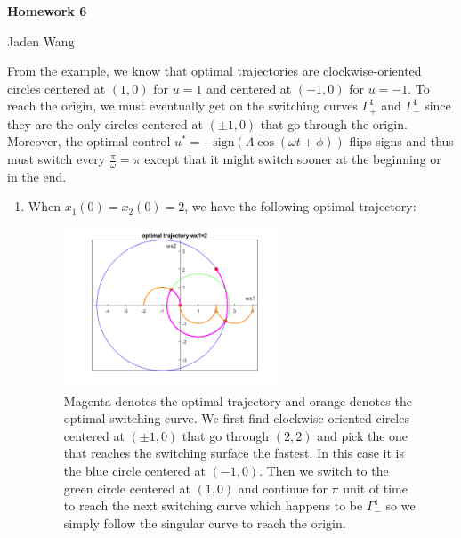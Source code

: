 \documentclass[12pt]{article}
\begin{document}
\centerline {\textsf{\textbf{\LARGE{Homework 6}}}}
\centerline {Jaden Wang}
\vspace{.15in}
\begin{problem}[1]
From the example, we know that optimal trajectories are clockwise-oriented circles centered at $ ( 1,0)$ for $ u=1$  and centered at $ (-1,0)$ for $ u = - 1$. To reach the origin, we must eventually get on the switching curves $ \Gamma_+^{1} $ and $ \Gamma_{-}^{1}$ since they are the only circles centered at $ (\pm1,0)$ that go through the origin. Moreover, the optimal control $ u^*  = - \text{sign}(\Lambda \cos(\omega t + \phi))$ flips signs and thus must switch every  $ \frac{\pi}{ \omega} = \pi$ except that it might switch sooner at the beginning or in the end. 

\begin{enumerate}[label=(\alph*)]
\item When $ x_1(0) = x_2(0)=2$, we have the following optimal trajectory:
~\begin{figure}[H]
	\centering
	\includegraphics[width=0.6\textwidth]{./figures/6.1.png}
\caption{Magenta denotes the optimal trajectory and orange denotes the optimal switching curve. We first find clockwise-oriented circles centered at $ (\pm 1,0)$ that go through $ (2,2)$ and pick the one that reaches the switching surface the fastest. In this case it is the blue circle centered at  $ (-1,0)$. Then we switch to the green circle centered at $ (1,0)$ and continue for $ \pi$ unit of time to reach the next switching curve which happens to be $ \Gamma_{-}^{1}$ so we simply follow the singular curve to reach the origin.}
\end{figure}


\end{enumerate}
\end{problem}
\end{document}
